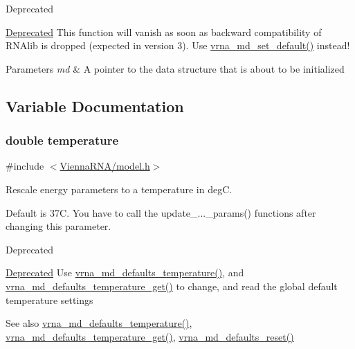 \begin{DoxyRefDesc}{Deprecated}
\item[\hyperlink{deprecated__deprecated000089}{Deprecated}]This function will vanish as soon as backward compatibility of R\+N\+Alib is dropped (expected in version 3). Use \hyperlink{group__model__details_ga8ac6ff84936282436f822644bf841f66}{vrna\+\_\+md\+\_\+set\+\_\+default()} instead!\end{DoxyRefDesc}



\begin{DoxyParams}{Parameters}
{\em md} & A pointer to the data structure that is about to be initialized \\
\hline
\end{DoxyParams}


\subsection{Variable Documentation}
\subsubsection[{\texorpdfstring{temperature}{temperature}}]{\setlength{\rightskip}{0pt plus 5cm}double temperature}\hypertarget{group__model__details_gab4b11c8d9c758430960896bc3fe82ead}{}\label{group__model__details_gab4b11c8d9c758430960896bc3fe82ead}


{\ttfamily \#include $<$\hyperlink{model_8h}{Vienna\+R\+N\+A/model.\+h}$>$}



Rescale energy parameters to a temperature in degC. 

Default is 37C. You have to call the update\+\_\+...\+\_\+params() functions after changing this parameter. \begin{DoxyRefDesc}{Deprecated}
\item[\hyperlink{deprecated__deprecated000088}{Deprecated}]Use \hyperlink{group__model__details_gaf9e527e9a2f7e6fd6e42bc6e602f5445}{vrna\+\_\+md\+\_\+defaults\+\_\+temperature()}, and \hyperlink{group__model__details_ga96b24a74437f9ba46c4e06343155bf46}{vrna\+\_\+md\+\_\+defaults\+\_\+temperature\+\_\+get()} to change, and read the global default temperature settings \end{DoxyRefDesc}
\begin{DoxySeeAlso}{See also}
\hyperlink{group__model__details_gaf9e527e9a2f7e6fd6e42bc6e602f5445}{vrna\+\_\+md\+\_\+defaults\+\_\+temperature()}, \hyperlink{group__model__details_ga96b24a74437f9ba46c4e06343155bf46}{vrna\+\_\+md\+\_\+defaults\+\_\+temperature\+\_\+get()}, \hyperlink{group__model__details_ga70834424cf804d149937de89f80ceb45}{vrna\+\_\+md\+\_\+defaults\+\_\+reset()} 
\end{DoxySeeAlso}
